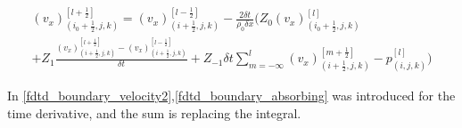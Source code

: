 \begin{multline}\label{fdtd_boundary_velocity2}
(v_x)_{(i_0+\frac{1}{2},j,k)}^{[l+\frac{1}{2}]}= (v_x)_{(i+\frac{1}{2},j,k)}^{[l-\frac{1}{2}]}-\frac{2 \delta t}{\rho_0 \delta x} \Biggl( 
 Z_0(v_x)_{(i_0+\frac{1}{2},j,k)}^{[l]} \\
+Z_1\frac{(v_x)_{(i+\frac{1}{2},j,k)}^{[l+\frac{1}{2}]}-(v_x)_{(i+\frac{1}{2},j,k)}^{[l-\frac{1}{2}]}}{\delta t}+Z_{-1} \delta t \sum_{m=-\infty}^{l}(v_x)_{(i+\frac{1}{2},j,k)}^{[m+\frac{1}{2}]}-p_{(i,j,k)}^{[l]}
\Biggr)
\end{multline}

In \autoref{fdtd_boundary_velocity2},\autoref{fdtd_boundary_absorbing} was introduced for the time derivative, and the sum is replacing the integral.